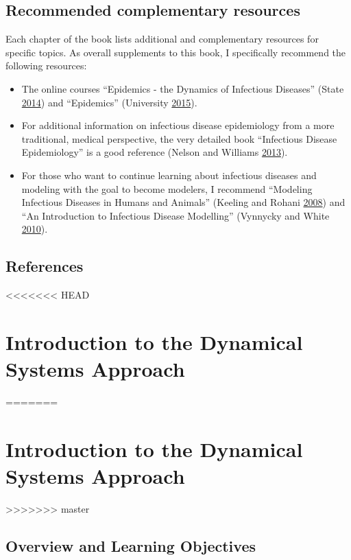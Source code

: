 \documentclass[]{book}
\providecommand{\tightlist}{%
  \setlength{\itemsep}{0pt}\setlength{\parskip}{0pt}}
\theoremstyle{definition}
\theoremstyle{definition}
\theoremstyle{definition}
\theoremstyle{remark}
\begin{document}
\hypertarget{recommended-complementary-resources}{%
\section{Recommended complementary
resources}\label{recommended-complementary-resources}}

Each chapter of the book lists additional and complementary resources
for specific topics. As overall supplements to this book, I specifically
recommend the following resources:

\begin{itemize}
\tightlist
\item
  The online courses ``Epidemics - the Dynamics of Infectious Diseases''
  (State \protect\hyperlink{ref-epimooc}{2014}) and ``Epidemics''
  (University \protect\hyperlink{ref-hkepidemics}{2015}).
\item
  For additional information on infectious disease epidemiology from a
  more traditional, medical perspective, the very detailed book
  ``Infectious Disease Epidemiology'' is a good reference (Nelson and
  Williams \protect\hyperlink{ref-nelson13}{2013}).
\item
  For those who want to continue learning about infectious diseases and
  modeling with the goal to become modelers, I recommend ``Modeling
  Infectious Diseases in Humans and Animals'' (Keeling and Rohani
  \protect\hyperlink{ref-keeling08}{2008}) and ``An Introduction to
  Infectious Disease Modelling'' (Vynnycky and White
  \protect\hyperlink{ref-vynnycky10}{2010}).
\end{itemize}

\hypertarget{references}{%
\section{References}\label{references}}

<<<<<<< HEAD
\hypertarget{idintro}{%
\chapter{Introduction to the Dynamical Systems Approach}\label{idintro}}
=======
\chapter{Introduction to the Dynamical Systems Approach}\label{idintro}
>>>>>>> master

\hypertarget{overview-and-learning-objectives}{%
\section{Overview and Learning
Objectives}\label{overview-and-learning-objectives}}
\end{document}
